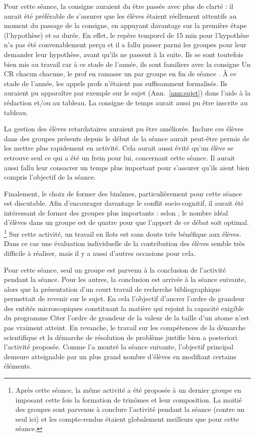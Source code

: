 \documentclass[12pt,a4paper, fleqn]{report}
\begin{document}
Pour cette séance, la consigne auraient du être passée avec plus de clarté : il aurait été préférable de s'assurer que les élèves étaient réellement attentifs au moment du passage de la consigne, en appuyant davantage sur la première étape (l'hypothèse) et sa durée.
En effet, le repère temporel de 15 min pour l'hypothèse n'a pas été convenablement perçu et il a fallu passer parmi les groupes pour leur demander leur hypothèse, avant qu'ils ne passent à la suite.
Ils se sont toutefois bien mis au travail car à ce stade de l'année, ils sont familiers avec la consigne \og Un CR chacun chacune, le prof en ramasse un par groupe en fin de séance \fg{}.
À ce stade de l'année, les appels profs n'étaient pas suffisamment formalisés.
Ils auraient pu apparaître par exemple sur le sujet (Ann.~\ref{ann:sujet}) dans l'aide à la rédaction et/ou au tableau.
La consigne de temps aurait aussi pu être inscrite au tableau.

La gestion des élèves retardataires auraient pu être améliorée.
Inclure ces élèves dans des groupes présents depuis le début de la séance aurait peut-être permis de les mettre plus rapidement en activité.
Cela aurait aussi évité qu'un élève se retrouve seul ce qui a été un frein pour lui, concernant cette séance.
Il aurait aussi fallu leur consacrer un temps plus important pour s'assurer qu'ils aient bien compris l'objectif de la séance.

Finalement, le choix de former des binômes, particulièrement pour cette séance est discutable.
Afin d'encourager davantage le conflit socio-cognitif, il aurait été intéressant de former des groupes plus importants : selon \cite{Courtillot2006}, le nombre idéal d'élèves dans un groupe est de quatre pour que l'apport de ce débat soit optimal.
\footnote{Après cette séance, la même activité a été proposée à un dernier groupe en imposant cette fois la formation de trinômes et leur composition.
La moitié des groupes sont parvenus à conclure l'activité pendant la séance (contre un seul ici) et les compte-rendus étaient globalement meilleurs que pour cette séance.}
Sur cette activité, un travail en îlots est sans doute très bénéfique aux élèves.
Dans ce cas une évaluation individuelle de la contribution des élèves semble très difficile à réaliser, mais il y a aussi d'autres occasions pour cela.

Pour cette séance, seul un groupe est parvenu à la conclusion de l'activité pendant la séance.
Pour les autres, la conclusion est arrivée à la séance suivante, alors que la présentation d'un court travail de recherche bibliographique permettait de revenir sur le sujet.
En cela l'objectif d'ancrer l'ordre de grandeur des entités microscopiques constituant la matière qui rejoint la capacité exigible du programme \og Citer l'ordre de grandeur de la valeur de la taille d'un atome \fg{} n'est pas vraiment atteint.
En revanche, le travail sur les compétences de la démarche scientifique et la démarche de résolution de problème justifie bien a posteriori l'activité proposée.
Comme l'a montré la séance suivante, l'objectif principal demeure atteignable par un plus grand nombre d'élèves en modifiant certains éléments.
\end{document}
